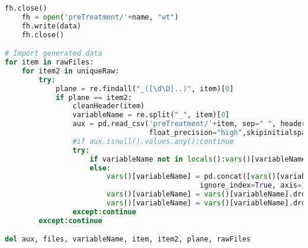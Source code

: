 \documentclass[../main.tex]{subfiles}
\begin{document}
\begin{lstlisting}[language=python]
    fh.close()
    fh = open('preTreatment/'+name, "wt")
    fh.write(data)
    fh.close()

# Import generated data
for item in rawFiles:
    for item2 in uniqueRaw:
        try:
            plane = re.findall("_([\d\D]..)", item)[0]
            if plane == item2:
                cleanHeader(item)
                variableName = re.split("_", item)[0]
                aux = pd.read_csv('preTreatment/'+item, sep=" ", header=1,
                                  float_precision="high",skipinitialspace=True)
                #if aux.isnull().values.any():continue
                try:
                    if variableName not in locals():vars()[variableName] = aux
                    else:
                        vars()[variableName] = pd.concat([vars()[variableName],aux],
                                              ignore_index=True, axis=1)
                        vars()[variableName] = vars()[variableName].dropna(axis=0, how='all')
                        vars()[variableName] = vars()[variableName].dropna(axis=1, how='all')
                except:continue
        except:continue

del aux, files, variableName, item, item2, plane, rawFiles

\end{lstlisting}
\end{document}
